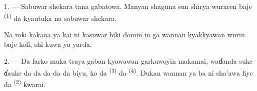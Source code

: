 %
%
%

\VUsaut{4.0mm}
\VUsaut{2.0mm}
\VUsaut{3.4mm}

1. --- Sabuwar shekara tana gabatowa. Manyan shaguna sun shirya
wuraren baje  \textsuperscript{(1)} da kyautuka na sabuwar
shekara.

Na roƙi kakana ya kai ni kasuwar biki domin in ga wannan kyakkyawan
wurin baje koli, shi kuwa ya yarda.

2. --- Da farko muka tsaya gaban kyawawan garkuwoyin makamai, waɗanda
suke ɗauke da  da  da  da  da  biyu,
ko  da  \textsuperscript{(3)} da  \textsuperscript{(4)}. Dukan wannan ya ba ni sha’awa fiye da
 \textsuperscript{(2)} ƙwarai.

